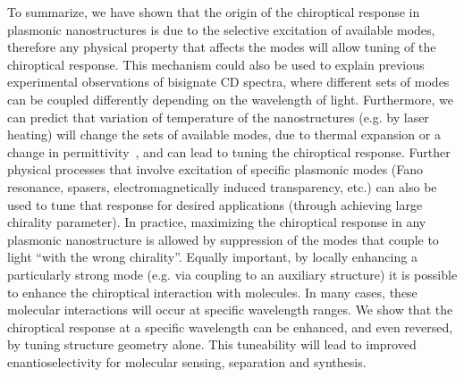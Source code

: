 To summarize, we have shown that the origin of the chiroptical response in plasmonic nanostructures is due to the selective excitation of available modes, therefore any physical property that affects the modes will allow tuning of the chiroptical response. This mechanism could also be used to explain previous experimental observations of bisignate CD spectra, where different sets of modes can be coupled differently depending on the wavelength of light. Furthermore, we can predict that variation of temperature of the nanostructures (e.g. by laser heating) will change the sets of available modes, due to thermal expansion or a change in permittivity~\cite{Aksyutov1977}, and can lead to tuning the chiroptical response. Further physical processes that involve excitation of specific plasmonic modes (Fano resonance, spasers, electromagnetically induced transparency, etc.) can also be used to tune that response for desired applications (through achieving large chirality parameter). 
In practice, maximizing the chiroptical response in any plasmonic nanostructure is allowed by suppression of the modes that couple to light ``with the wrong chirality''. Equally important, by locally enhancing a particularly strong mode (e.g. via coupling to an auxiliary structure) it is possible to enhance the chiroptical interaction with molecules. In many cases, these molecular interactions will occur at specific wavelength ranges. We show that the chiroptical response at a specific wavelength can be enhanced, and even reversed, by tuning structure geometry alone. This tuneability will lead to improved enantioselectivity for molecular sensing, separation and synthesis.